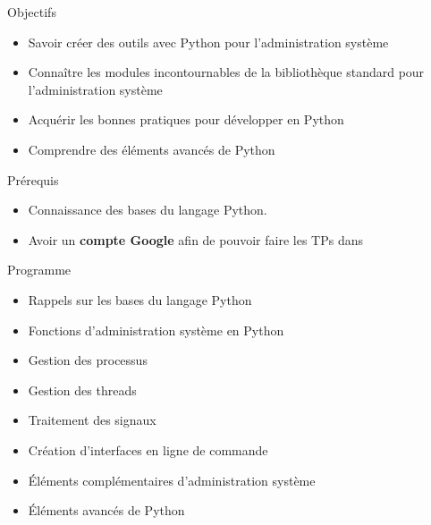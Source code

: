 \begin{frame}{Objectifs}
  \begin{itemize}
    \item Savoir créer des outils avec Python pour l'administration système
    \item Connaître les modules incontournables de la bibliothèque standard pour l'administration système
    \item Acquérir les bonnes pratiques pour développer en Python
    \item Comprendre des éléments avancés de Python
  \end{itemize}
\end{frame}

\begin{frame}{Prérequis}
  \begin{itemize}
  \item Connaissance des bases du langage Python.
  \item Avoir un \textbf{compte Google} afin de pouvoir faire les TPs dans 
  \end{itemize}
\end{frame}

\begin{frame}{Programme}
  \begin{itemize}
    \item Rappels sur les bases du langage Python
    \item Fonctions d'administration système en Python
    \item Gestion des processus
    \item Gestion des threads
    \item Traitement des signaux
    \item Création d'interfaces en ligne de commande
    \item Éléments complémentaires d'administration système
    \item Éléments avancés de Python
  \end{itemize}
\end{frame}
